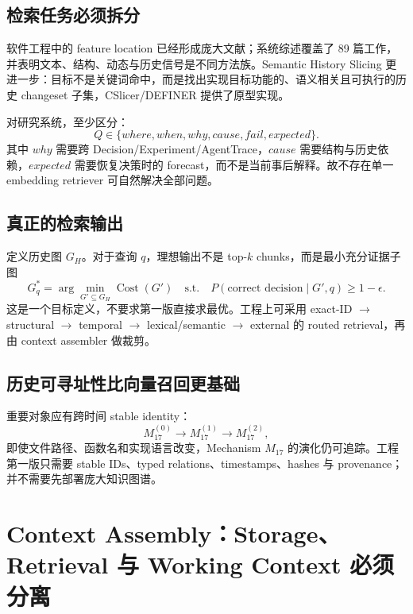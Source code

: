 \documentclass[11pt,a4paper]{ctexart}
\newcommand{\Cost}{\operatorname{Cost}}
\begin{document}
\subsection{检索任务必须拆分}
软件工程中的 feature location 已经形成庞大文献；系统综述覆盖了 89 篇工作，并表明文本、结构、动态与历史信号是不同方法族\cite{dit2013feature}。Semantic History Slicing 更进一步：目标不是关键词命中，而是找出实现目标功能的、语义相关且可执行的历史 changeset 子集\cite{li2022semantic}，CSlicer/DEFINER 提供了原型实现\cite{cslicerrepo}。

对研究系统，至少区分：
\begin{equation}
Q\in\{where,when,why,cause,fail,expected\}.
\end{equation}
其中 $why$ 需要跨 Decision/Experiment/AgentTrace，$cause$ 需要结构与历史依赖，$expected$ 需要恢复决策时的 forecast，而不是当前事后解释。故不存在单一 embedding retriever 可自然解决全部问题。

\subsection{真正的检索输出}
定义历史图 $G_H$。对于查询 $q$，理想输出不是 top-$k$ chunks，而是最小充分证据子图
\begin{equation}
G_q^*=\arg\min_{G'\subseteq G_H}\Cost(G')
\quad\text{s.t.}\quad
P(\text{correct decision}\mid G',q)\ge 1-\epsilon.
\end{equation}
这是一个目标定义，不要求第一版直接求最优。工程上可采用 exact-ID $\to$ structural $\to$ temporal $\to$ lexical/semantic $\to$ external 的 routed retrieval，再由 context assembler 做裁剪。

\subsection{历史可寻址性比向量召回更基础}
重要对象应有跨时间 stable identity：
\begin{equation}
M_{17}^{(0)}\to M_{17}^{(1)}\to M_{17}^{(2)},
\end{equation}
即使文件路径、函数名和实现语言改变，Mechanism $M_{17}$ 的演化仍可追踪。工程第一版只需要 stable IDs、typed relations、timestamps、hashes 与 provenance；并不需要先部署庞大知识图谱。

\section{Context Assembly：Storage、Retrieval 与 Working Context 必须分离}
\end{document}
